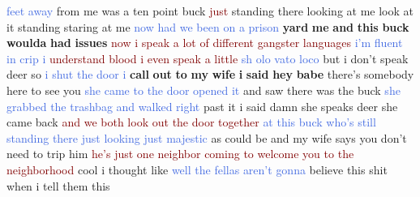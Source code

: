 \textcolor{RoyalBlue}{feet} \textcolor{RoyalBlue}{away} from me was a ten point buck \textcolor{Maroon}{just} standing there looking at me look at it standing staring at me \textcolor{RoyalBlue}{now} \textcolor{RoyalBlue}{had} \textcolor{RoyalBlue}{we} \textcolor{RoyalBlue}{been} \textcolor{RoyalBlue}{on} \textcolor{RoyalBlue}{a} \textcolor{RoyalBlue}{prison} \textbf{yard} \textbf{me} \textbf{and} \textbf{this} \textbf{buck} \textbf{woulda} \textbf{had} \textbf{issues} \textcolor{Maroon}{now} \textcolor{Maroon}{i} \textcolor{Maroon}{speak} \textcolor{Maroon}{a} \textcolor{Maroon}{lot} \textcolor{Maroon}{of} \textcolor{Maroon}{different} \textcolor{Maroon}{gangster} \textcolor{Maroon}{languages} \textcolor{RoyalBlue}{i'm} \textcolor{RoyalBlue}{fluent} \textcolor{RoyalBlue}{in} \textcolor{RoyalBlue}{crip} \textcolor{RoyalBlue}{i} \textcolor{Maroon}{understand} \textcolor{Maroon}{blood} \textcolor{Maroon}{i} \textcolor{Maroon}{even} \textcolor{Maroon}{speak} \textcolor{Maroon}{a} \textcolor{Maroon}{little} \textcolor{RoyalBlue}{sh} \textcolor{RoyalBlue}{olo} \textcolor{RoyalBlue}{vato} \textcolor{RoyalBlue}{loco} but i don't speak deer so \textcolor{RoyalBlue}{i} \textcolor{RoyalBlue}{shut} \textcolor{RoyalBlue}{the} \textcolor{RoyalBlue}{door} \textcolor{RoyalBlue}{i} \textbf{call} \textbf{out} \textbf{to} \textbf{my} \textbf{wife} \textbf{i} \textbf{said} \textbf{hey} \textbf{babe} there's somebody here to see you \textcolor{RoyalBlue}{she} \textcolor{RoyalBlue}{came} \textcolor{RoyalBlue}{to} \textcolor{RoyalBlue}{the} \textcolor{RoyalBlue}{door} \textcolor{RoyalBlue}{opened} \textcolor{RoyalBlue}{it} and saw there was the buck \textcolor{RoyalBlue}{she} \textcolor{RoyalBlue}{grabbed} \textcolor{RoyalBlue}{the} \textcolor{RoyalBlue}{trashbag} \textcolor{RoyalBlue}{and} \textcolor{RoyalBlue}{walked} \textcolor{RoyalBlue}{right} past it i said damn she speaks deer she came back \textcolor{Maroon}{and} \textcolor{Maroon}{we} \textcolor{Maroon}{both} \textcolor{Maroon}{look} \textcolor{Maroon}{out} \textcolor{Maroon}{the} \textcolor{Maroon}{door} \textcolor{Maroon}{together} \textcolor{RoyalBlue}{at} \textcolor{RoyalBlue}{this} \textcolor{RoyalBlue}{buck} \textcolor{RoyalBlue}{who's} \textcolor{RoyalBlue}{still} \textcolor{RoyalBlue}{standing} \textcolor{RoyalBlue}{there} \textcolor{RoyalBlue}{just} \textcolor{RoyalBlue}{looking} \textcolor{RoyalBlue}{just} \textcolor{RoyalBlue}{majestic} as could be and my wife says you don't need to trip him \textcolor{Maroon}{he's} \textcolor{Maroon}{just} \textcolor{Maroon}{one} \textcolor{Maroon}{neighbor} \textcolor{Maroon}{coming} \textcolor{Maroon}{to} \textcolor{Maroon}{welcome} \textcolor{Maroon}{you} \textcolor{Maroon}{to} \textcolor{Maroon}{the} \textcolor{Maroon}{neighborhood} cool i thought like \textcolor{RoyalBlue}{well} \textcolor{RoyalBlue}{the} \textcolor{RoyalBlue}{fellas} \textcolor{RoyalBlue}{aren't} \textcolor{RoyalBlue}{gonna} believe this shit when i tell them this